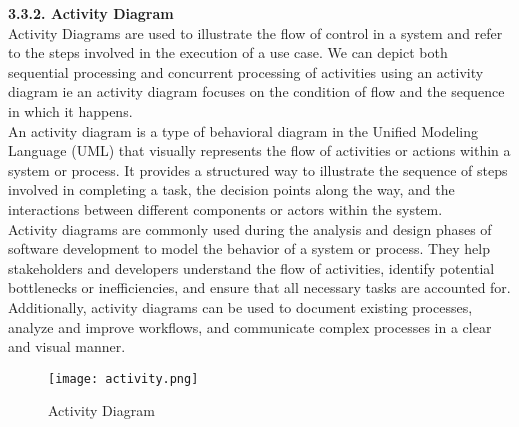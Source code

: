 \documentclass[12pt, English]{article}
\newcommand\tab[1][1cm]{\hspace*{#1}}
\begin{document}
\begin{normalsize}
\textbf{3.3.2. Activity Diagram}\\
\tab Activity Diagrams are used to illustrate the flow of control in a system and refer to the steps involved in the execution of a use case. We can depict both sequential processing and concurrent processing of activities using an activity diagram ie an activity diagram focuses on the condition of flow and the sequence in which it happens.\\

An activity diagram is a type of behavioral diagram in the Unified Modeling Language (UML) that visually represents the flow of activities or actions within a system or process. It provides a structured way to illustrate the sequence of steps involved in completing a task, the decision points along the way, and the interactions between different components or actors within the system.\\

Activity diagrams are commonly used during the analysis and design phases of software development to model the behavior of a system or process. They help stakeholders and developers understand the flow of activities, identify potential bottlenecks or inefficiencies, and ensure that all necessary tasks are accounted for. Additionally, activity diagrams can be used to document existing processes, analyze and improve workflows, and communicate complex processes in a clear and visual manner.
\\
\begin{figure}[htb]
\begin{center}
\texttt{[image: activity.png]}
\end{center}
\begin{center}
\renewcommand{\thefigure}{3.3.1.1}
\caption{\footnotesize Activity Diagram }
\end{center}
\end{figure}
\\\\\\\\\\\\

\begin{center}

\end{center}
\end{normalsize}
\end{document}
